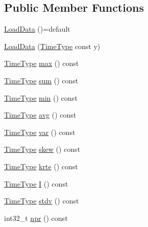 \subsection*{Public Member Functions}
\begin{DoxyCompactItemize}
\item 
\hyperlink{structvt_1_1vrt_1_1collection_1_1balance_1_1_load_data_afc2d1f780b2a168ec80f0cf28c830847}{Load\+Data} ()=default
\item 
\hyperlink{structvt_1_1vrt_1_1collection_1_1balance_1_1_load_data_ab15ccb21a9dd47492da6af32ca57cc5a}{Load\+Data} (\hyperlink{namespacevt_a876a9d0cd5a952859c72de8a46881442}{Time\+Type} const y)
\item 
\hyperlink{namespacevt_a876a9d0cd5a952859c72de8a46881442}{Time\+Type} \hyperlink{structvt_1_1vrt_1_1collection_1_1balance_1_1_load_data_a5b1b307477ac122e6df08f28ecf6bb71}{max} () const
\item 
\hyperlink{namespacevt_a876a9d0cd5a952859c72de8a46881442}{Time\+Type} \hyperlink{structvt_1_1vrt_1_1collection_1_1balance_1_1_load_data_a1c941d76f28ff10dd78a55553f9b58ce}{sum} () const
\item 
\hyperlink{namespacevt_a876a9d0cd5a952859c72de8a46881442}{Time\+Type} \hyperlink{structvt_1_1vrt_1_1collection_1_1balance_1_1_load_data_a3a4fc0cb3206cb552e83ef1caa8975eb}{min} () const
\item 
\hyperlink{namespacevt_a876a9d0cd5a952859c72de8a46881442}{Time\+Type} \hyperlink{structvt_1_1vrt_1_1collection_1_1balance_1_1_load_data_ac486f8036d3af52bc5879170ff221046}{avg} () const
\item 
\hyperlink{namespacevt_a876a9d0cd5a952859c72de8a46881442}{Time\+Type} \hyperlink{structvt_1_1vrt_1_1collection_1_1balance_1_1_load_data_ad3008ba8640803abb1a22b37c4224781}{var} () const
\item 
\hyperlink{namespacevt_a876a9d0cd5a952859c72de8a46881442}{Time\+Type} \hyperlink{structvt_1_1vrt_1_1collection_1_1balance_1_1_load_data_a4b32171c4432454889ad11e611e6e705}{skew} () const
\item 
\hyperlink{namespacevt_a876a9d0cd5a952859c72de8a46881442}{Time\+Type} \hyperlink{structvt_1_1vrt_1_1collection_1_1balance_1_1_load_data_a01ab8ead157e42fa39ac1ab19ab109c0}{krte} () const
\item 
\hyperlink{namespacevt_a876a9d0cd5a952859c72de8a46881442}{Time\+Type} \hyperlink{structvt_1_1vrt_1_1collection_1_1balance_1_1_load_data_aa5715f66445228e6d7961987443b0e68}{I} () const
\item 
\hyperlink{namespacevt_a876a9d0cd5a952859c72de8a46881442}{Time\+Type} \hyperlink{structvt_1_1vrt_1_1collection_1_1balance_1_1_load_data_accad5fedd41c42f6d0d7f94ee78d97b1}{stdv} () const
\item 
int32\+\_\+t \hyperlink{structvt_1_1vrt_1_1collection_1_1balance_1_1_load_data_a177178abc3a99dbbe51c5873e86f1ada}{npr} () const
\end{DoxyCompactItemize}
